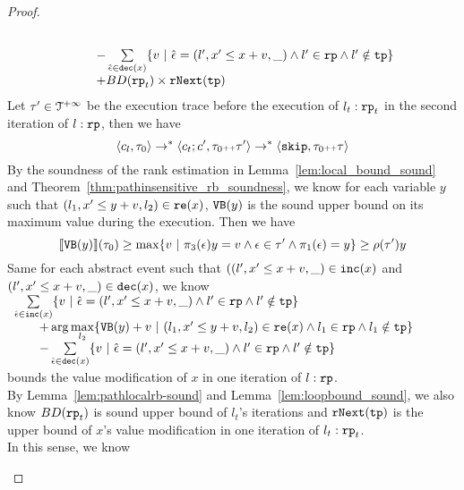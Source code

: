\begin{proof}
\begin{itemize}
\[\begin{array}{l}
\begin{array}{l}
        \\ \qquad 
        - \sum\limits_{ \absevent \in \dec(x) }\left\{ 
        v 
        ~\middle\vert~ \absevent = (l', x' \leq x + v, \_) \land l' \in \rprog \land l' \notin \tpath \right\}
        \\ \qquad 
        + BD(\rprog_t) \times \rfnext(\tpath)
      \end{array}
    \end{array}
  \]
  Let $\mathtt{\tau}' \in \mathcal{T}^{+\infty}$ be the execution trace before the execution of $l_t: \mathtt{rp}_t$ in the second iteration of $l:\mathtt{rp}$, then we have
  \[
    \langle c_l, \mathtt{\tau}_0 \rangle \to^* \langle c_t;c', \mathtt{\tau}_0 {\scriptscriptstyle ++} \mathtt{\tau}' \rangle \to^* \langle \mathtt{skip}, \mathtt{\tau}_0 {\scriptscriptstyle ++} \mathtt{\tau} \rangle
  \]
    By the soundness of the rank estimation in Lemma~\ref{lem:local_bound_sound} and Theorem~\ref{thm:pathinsensitive_rb_soundness}, we know 
    for each variable $y$ such that $(l_1, x' \leq y + v, l_2) \in \mathtt{re}(x) $,
    ${\mathtt{VB}}(y)$ is the sound upper bound on its maximum value during the execution. Then we have
    \[
      \econfig{\varinvar(y)}(\trace_0) \geq \max \left\{ v ~|~  \pi_3(\event) y = v \land \event \in \trace' \land \pi_1(\event) = y\right\}  \geq \env(\trace') y 
    \]
    Same for each abstract event such that $((l', x' \leq x + v, \_) \in \mathtt{inc}(x) $ and $(l', x' \leq x + v, \_) \in \mathtt{dec}(x)$,
    we know 
    $ \begin{array}{l}
      \sum\limits_{\absevent \in \inc(x) }
      \left\{ 
      v ~\middle\vert~ \absevent = (l', x' \leq x + v, \_) \land  l' \in \rprog 
      \land l' \notin \tpath \right\}
      \\ \qquad 
      + \arg\max\limits_{l_2 }
          \left\{ 
            \varinvar(y) + v ~\middle\vert~ 
          (l_1, x' \leq y + v, l_2) \in \reset(x) \land l_1 \in \rprog \land l_1 \notin \tpath
          \right\}
      \\ \qquad 
      - \sum\limits_{ \absevent \in \dec(x) }\left\{ 
      v 
      ~\middle\vert~ \absevent = (l', x' \leq x + v, \_) \land l' \in \rprog \land l' \notin \tpath \right\}
    \end{array}
    $ bounds the value modification of $x$ in one iteration of $l: \mathtt{rp}$.
  \\
  By Lemma~\ref{lem:pathlocalrb-sound} and Lemma~\ref{lem:loopbound_sound}, we also know $BD(\mathtt{rp}_t)$ is sound upper bound of $l_t$'s iterations and $\mathtt{rNext}(\mathtt{tp})$ is the upper bound of $x$'s value modification in one iteration of $l_t: \mathtt{rp}_t$.
  \\
  In this sense, we know

\end{itemize}
\end{proof}
